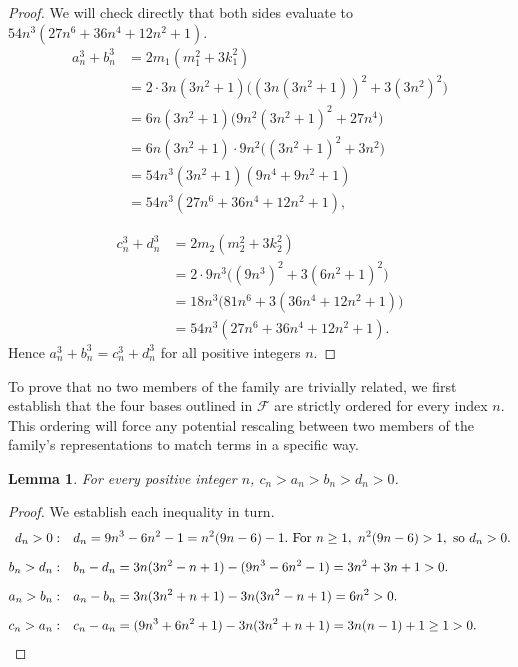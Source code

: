 \documentclass[12pt]{amsart}
\newtheorem{lemma}{Lemma}
\theoremstyle{definition}
\theoremstyle{remark}
\begin{document}
\begin{proof}
We will check directly that both sides evaluate to 
$54n^3(27n^6 + 36n^4 + 12n^2 + 1)$. 
\begin{align*}
  a_n^3 + b_n^3 &= 2m_1(m_1^2 + 3k_1^2) \\
  &= 2 \cdot 3n(3n^2+1)\bigl((3n(3n^2+1))^2 + 3(3n^2)^2\bigr) \\
  &= 6n(3n^2+1)\bigl(9n^2(3n^2+1)^2 + 27n^4\bigr) \\
  &= 6n(3n^2+1) \cdot 9n^2\bigl((3n^2+1)^2 + 3n^2\bigr) \\
  &= 54n^3(3n^2+1)(9n^4 + 9n^2 + 1) \\
  &= 54n^3(27n^6 + 36n^4 + 12n^2 + 1),
\end{align*}

\begin{align*}
  c_n^3 + d_n^3 &= 2m_2(m_2^2 + 3k_2^2) \\
  &= 2 \cdot 9n^3\bigl((9n^3)^2 + 3(6n^2+1)^2\bigr) \\
  &= 18n^3\bigl(81n^6 + 3(36n^4 + 12n^2 + 1)\bigr) \\
  &= 54n^3(27n^6 + 36n^4 + 12n^2 + 1).
\end{align*}
Hence $a_n^3 + b_n^3 = c_n^3 + d_n^3$ for all positive integers $n$.
\end{proof}

To prove that no two members of the family are trivially related, we 
first establish that the four bases outlined in $\mathcal{F}$ are strictly ordered for every index 
$n$. This ordering will force any potential rescaling between two members 
of the family's representations to match terms in a specific way.

\begin{lemma}\label{lem:ordering}
  For every positive integer $n$, $c_n > a_n > b_n > d_n > 0$.
\end{lemma}

\begin{proof}
We establish each inequality in turn.
\begin{align*}
d_n > 0: \quad & d_n = 9n^3 - 6n^2 - 1 = n^2(9n-6) - 1. 
\text{ For } n \ge 1,\ n^2(9n-6) > 1, \text{ so } d_n > 0.\\[6pt]
b_n > d_n: \quad & b_n - d_n = 3n(3n^2-n+1) - (9n^3-6n^2-1) 
= 3n^2 + 3n + 1 > 0. \\[6pt]
a_n > b_n: \quad & a_n - b_n = 3n(3n^2+n+1) - 3n(3n^2-n+1) = 6n^2 > 0. \\[6pt]
c_n > a_n: \quad & c_n - a_n = (9n^3+6n^2+1) - 3n(3n^2+n+1) 
= 3n(n-1) + 1 \ge 1 > 0. \qedhere
\end{align*}
\end{proof}
\end{document}
